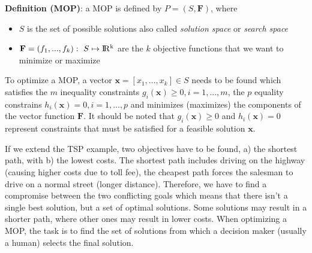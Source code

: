 \noindent\textbf{Definition (MOP)}: a MOP is defined by $P=(S,\mathbf{F})$, where
\begin{itemize}
  \item $S$ is the set of possible solutions also called \emph{solution space} or \emph{search space}
  \item $\mathbf{F} = (f_1,...,f_k): \ S \mapsto {\rm I\!R^k}$ are the $k$ objective functions that we want to minimize or maximize
\end{itemize}

To optimize a MOP, a vector $\mathbf{x} = [x_1,...,x_k] \in S$ needs to be found which satisfies the $m$ inequality constraints $g_i(\mathbf{x}) \ge 0, i=1,...,m$, the $p$ equality constrains $h_i(\mathbf{x}) = 0, i=1,...,p$ and minimizes (maximizes) the components of the vector function $\mathbf{F}$. It should be noted that $g_i(\mathbf{x}) \ge 0$ and $h_i(\mathbf{x}) = 0$ represent constraints that must be satisfied for a feasible solution $\mathbf{x}$.


If we extend the TSP example, two objectives have to be found, a) the shortest path, with b) the lowest costs. The shortest path includes driving on the highway (causing higher costs due to toll fee), the cheapest path forces the salesman to drive on a normal street (longer distance). Therefore, we have to find a compromise between the two conflicting goals which means that there isn't a single best solution, but a set of optimal solutions. Some solutions may result in a shorter path, where other ones may result in lower costs. When optimizing a MOP, the task is to find the set of solutions from which a decision maker (usually a human) selects the final solution.

